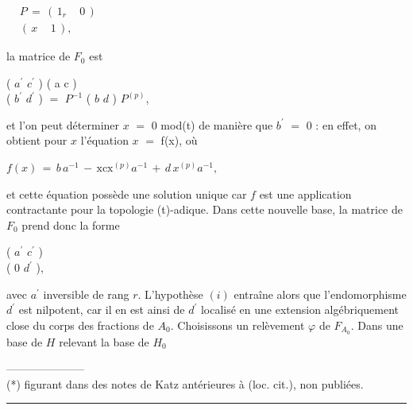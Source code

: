 \documentclass[9pt]{article}
\newcommand{\CanonText}[1]{\par{\fontsize{8.0}{9.35}\selectfont\RaggedRight #1\par}\vspace{2.2pt}}
\newcommand{\CanonDisplay}[1]{\par\vspace{1.2pt}\begin{center}{\fontsize{7.2}{8.4}\selectfont\(\displaystyle #1\)}\end{center}\vspace{1.2pt}}
\newenvironment{CanonMathBlock}{\par\vspace{1.2pt}\begin{center}\fontsize{6.8}{8.0}\selectfont\(\displaystyle}{\)\end{center}\vspace{1.2pt}}
\begin{document}
\begin{minipage}[t][\dimexpr\textheight-5pt\relax][t]{\textwidth}
\begin{CanonMathBlock}
\begin{aligned}
& P\,=\,(\,1_{r}\quad\,0\,)\\
& (\,x\quad\,1\,),
\end{aligned}
\end{CanonMathBlock}
\CanonText{la matrice de \(F_{0}\) est}
\CanonText{( \(a^{\prime}\) \(c^{\prime}\) ) ( a c )\\( \(b^{\prime}\) \(d^{\prime}\) ) \(=\) \(P^{-1}\) ( \(b\) \(d\) ) \(P^{(p)}\),}
\CanonText{et l'on peut déterminer \(x\) \(=\) 0 mod(t) de manière que \(b^{\prime}\) \(=\) 0 : en effet, on obtient pour \(x\) l'équation \(x\) \(=\) f(x), où}
\CanonDisplay{f(x)\,=\,b\,a^{-1}\,-\,\text{xcx}^{(p)}a^{-1}\,+\,d\,x^{(p)}a^{-1},}
\CanonText{et cette équation possède une solution unique car \(f\) est une application contractante pour la topologie (t)-adique. Dans cette nouvelle base, la matrice de \(F_{0}\) prend donc la forme}
\CanonText{( \(a^{\prime}\) \(c^{\prime}\) )\\( 0 \(d^{\prime}\) ),}
\CanonText{avec \(a^{\prime}\) inversible de rang \(r\). L'hypothèse \((i)\) entraîne alors que l'endomorphisme \(d^{\prime}\) est nilpotent, car il en est ainsi de \(d^{\prime}\) localisé en une extension algébriquement close du corps des fractions de \(A_{0}\). Choisissons un relèvement \(\varphi{}\) de \(F_{A_{0}}\). Dans une base de \(H\) relevant la base de \(H_{0}\)}
\CanonText{---------------------\\(*) figurant dans des notes de Katz antérieures à (loc. cit.), non publiées.}
\vfill
{\color{Accent}\hrule height 0.35pt}\vspace{3pt}
\end{minipage}
\newpage
\end{document}

